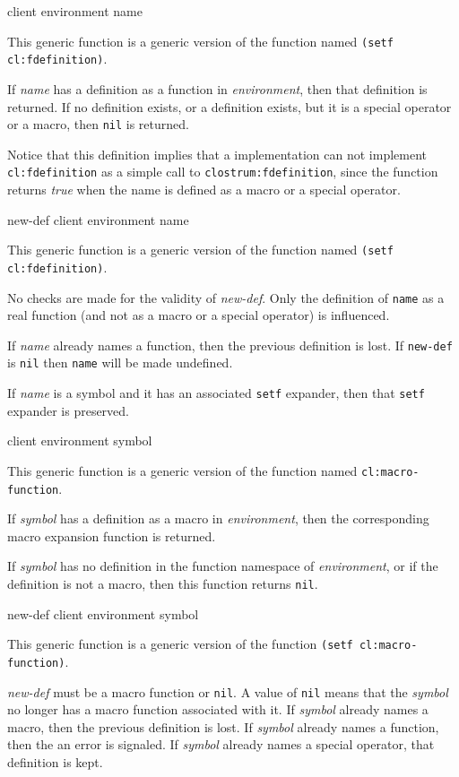  {client environment name}

This generic function is a generic version of the \commonlisp{}
function named \texttt{(setf cl:fdefinition)}.

If \textit{name} has a definition as a function in
\textit{environment}, then that definition is returned.  If no
definition exists, or a definition exists, but it is a special
operator or a macro, then \texttt{nil} is returned.

Notice that this definition implies that a \commonlisp{}
implementation can not implement \texttt{cl:fdefinition} as a simple call
to \texttt{clostrum:fdefinition}, since the \commonlisp{} function
returns \textit{true} when the name is defined as a macro or a special
operator.

 {new-def client environment name}

This generic function is a generic version of the \commonlisp{}
function named \texttt{(setf cl:fdefinition)}.

No checks are made for the validity of \textit{new-def}.  Only the
definition of \texttt{name} as a real function (and not as a
macro or a special operator) is influenced.

If \textit{name} already names a function, then the previous
definition is lost.  If \texttt{new-def} is \texttt{nil} then
\texttt{name} will be made undefined.

If \textit{name} is a symbol and it has an associated
\texttt{setf} expander, then that \texttt{setf} expander is preserved.

 {client environment symbol}

This generic function is a generic version of the \commonlisp{}
function named \texttt{cl:macro-function}.

If \textit{symbol} has a definition as a macro in
\textit{environment}, then the corresponding macro expansion function
is returned.

If \textit{symbol} has no definition in the function namespace of
\textit{environment}, or if the definition is not a macro, then this
function returns \texttt{nil}.

 {new-def client environment symbol}

This generic function is a generic version of the \commonlisp{}
function \texttt{(setf cl:macro-function)}.

\textit{new-def} must be a macro function or \texttt{nil}.  A value of
\texttt{nil} means that the \textit{symbol} no longer has a macro
function associated with it.  If \textit{symbol} already names a
macro, then the previous definition is lost.  If \textit{symbol}
already names a function, then the an error is signaled.  If
\textit{symbol} already names a special operator, that definition is
kept.


